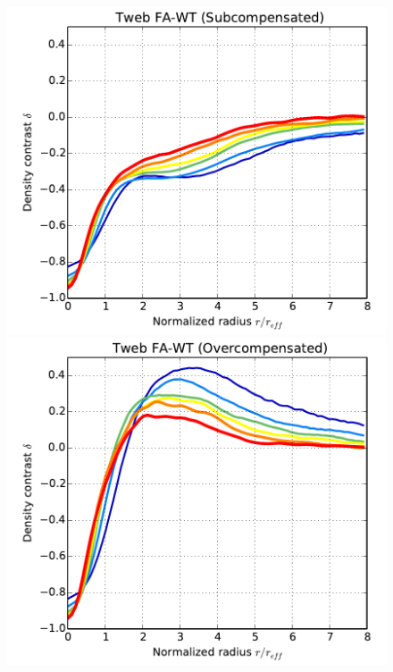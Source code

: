 \documentclass[a4,useAMS,usenatbib,usegraphicx]{mn2e}
\begin{document}
\begin{figure}
\centering
  \includegraphics[trim = 2mm 2mm 5mm 0mm, clip, keepaspectratio=true,
  width=0.35\textheight]{voids_density_TwebFAG0.pdf}
  \includegraphics[trim = 2mm 2mm 5mm 0mm, clip, keepaspectratio=true,
  width=0.35\textheight]{voids_density_TwebFAG1.pdf}


\end{figure}
\end{document}
